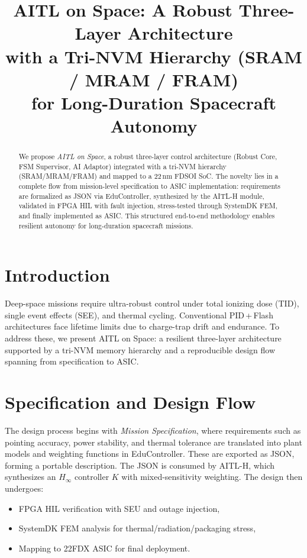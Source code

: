 \documentclass[conference]{IEEEtran}
\title{AITL on Space: A Robust Three-Layer Architecture\\
with a Tri-NVM Hierarchy (SRAM / MRAM / FRAM)\\
for Long-Duration Spacecraft Autonomy}
\author{
\IEEEauthorblockN{Shinichi Samizo}
\IEEEauthorblockA{Independent Semiconductor Researcher\\
Former Engineer at Seiko Epson Corporation\\
Email: \href{mailto:shin3t72@gmail.com}{shin3t72@gmail.com}\\
GitHub: \url{https://github.com/Samizo-AITL}}
}
\begin{document}
\maketitle

\begin{abstract}
We propose \emph{AITL on Space}, a robust three-layer control architecture (Robust Core, FSM Supervisor, AI Adaptor) integrated with a tri-NVM hierarchy (SRAM/MRAM/FRAM) and mapped to a 22\,nm FD\!SOI SoC. The novelty lies in a complete flow from mission-level specification to ASIC implementation: requirements are formalized as JSON via EduController, synthesized by the AITL-H module, validated in FPGA HIL with fault injection, stress-tested through SystemDK FEM, and finally implemented as ASIC. This structured end-to-end methodology enables resilient autonomy for long-duration spacecraft missions.
\end{abstract}

\section{Introduction}
Deep-space missions require ultra-robust control under total ionizing dose (TID), single event effects (SEE), and thermal cycling. Conventional PID\,+\,Flash architectures face lifetime limits due to charge-trap drift and endurance. To address these, we present AITL on Space: a resilient three-layer architecture supported by a tri-NVM memory hierarchy and a reproducible design flow spanning from specification to ASIC.

\section{Specification and Design Flow}
The design process begins with \emph{Mission Specification}, where requirements such as pointing accuracy, power stability, and thermal tolerance are translated into plant models and weighting functions in EduController. These are exported as JSON, forming a portable description. The JSON is consumed by AITL-H, which synthesizes an $H_\infty$ controller $K$ with mixed-sensitivity weighting. The design then undergoes:

\begin{itemize}
  \item FPGA HIL verification with SEU and outage injection,
  \item SystemDK FEM analysis for thermal/radiation/packaging stress,
  \item Mapping to 22FDX ASIC for final deployment.
\end{itemize}
\end{document}
